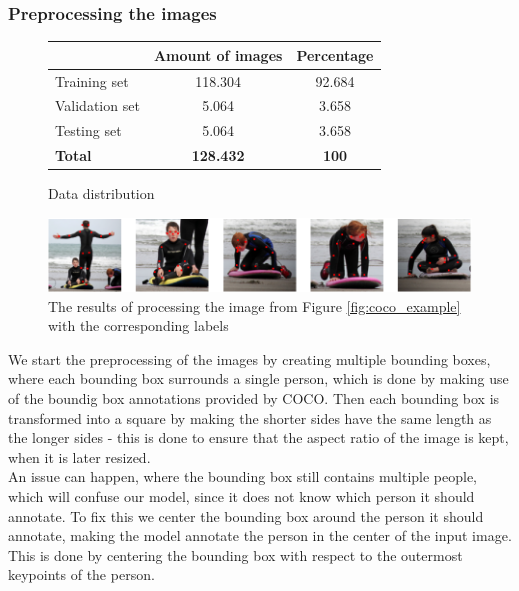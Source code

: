 \documentclass[main.tex]{subfiles}
\begin{document}
\subsubsection{Preprocessing the images}
\begin{figure}[H]
    \centering
    \begin{tabular}{l|c|c}
         & Amount of images & Percentage \\
        \hline
        Training set & 118.304 & 92.684 \\
        \hline
        Validation set & 5.064 & 3.658 \\
        \hline
        Testing set & 5.064 & 3.658 \\
        \hline
        \hline
        \textbf{Total} & \textbf{128.432} & \textbf{100} \\
        \hline
    \end{tabular}
    \caption{Data distribution}
    \label{tab:data_distribution}
\end{figure}
\begin{figure}[H]
    \centering
    \includegraphics[width = \textwidth - 2 cm]{./entities/crop_img.PNG}
    \caption{The results of processing the image from Figure \ref{fig:coco_example} with the corresponding labels \cite{COCO_article}}
    \label{fig:crop_img}
\end{figure}
We start the preprocessing of the images by creating multiple bounding boxes, where each bounding box surrounds a single person, which is done by making use of the boundig box annotations provided by COCO. Then each bounding box is transformed into a square by making the shorter sides have the same length as the longer sides - this is done to ensure that the aspect ratio of the image is kept, when it is later resized. \\
An issue can happen, where the bounding box still contains multiple people, which will confuse our model, since it does not know which person it should annotate. To fix this we center the bounding box around the person it should annotate, making the model annotate the person in the center of the input image. This is done by centering the bounding box with respect to the outermost keypoints of the person. \\
\end{document}
